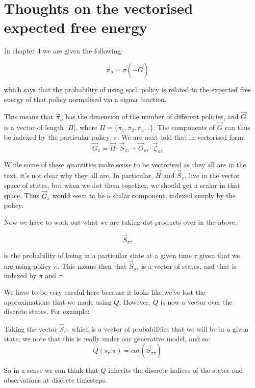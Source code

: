 \documentclass[11pt,oneside]{memoir}
\newcounter{example}
\begin{document}
\chapter{Thoughts on the vectorised expected free energy}

In chapter 4 we are given the following:

\begin{equation}
    \vec{\pi}_o=\sigma(-\vec{G})
\end{equation}

which says that the probability of using each policy is related to the expected free energy of that policy normalised via a sigma function.

This means that $\vec{\pi}_o$ has the dimension of the number of different policies, and $\vec{G}$ is a vector of length $|\Pi|$, where $\Pi=\{\pi_1,\pi_2,\pi_3...\}$. The components of $\vec{G}$ can thus be indexed by the particular policy, $\pi$. We are next told that in vectorised form:
\begin{equation} \label{Gvec}   \vec{G}_\pi=\vec{H}\cdot\vec{S}_{\pi\tau}+\vec{O}_{\pi\tau}\cdot\vec{\zeta}_{\pi\tau}
\end{equation}

While some of these quantities make sense to be vectorised as they all are in the text, it's not clear why they all are. In particular, $\vec{H}$ and $\vec{S}_{\pi\tau}$ live in the vector space of states, but when we dot them together, we should get a scalar in that space. Thus $\vec{G}_\pi$ would seem to be a scalar component, indexed simply by the policy.

Now we have to work out what we are taking dot products over in the above.

\begin{equation}
\vec{S}_{\pi\tau}
\end{equation}

is the probability of being in a particular state at a given time $\tau$ given that we are using policy $\pi$. This means then that $\vec{S}_{\pi\tau}$ is a vector of states, and that is indexed by $\pi$ and $\tau$.

\begin{tcolorbox}[colback=red!5!white,colframe=black!75!black]
  

We have to be very careful here because it looks like we've lost the approximations that we made using $Q$. However, $Q$ is now a vector over the discrete states. For example:

Taking the vector $\vec{S}_{\pi\tau}$ which is a vector of probabilities that we will be in a given state, we note that this is really under our generative model, and so:
$$Q(s_\tau|\pi)=cat(\vec{S}_{\pi\tau})$$

So in a sense we can think that $Q$ inherits the discrete indices of the states and observations at discrete timesteps.
\end{tcolorbox}
\end{document}
